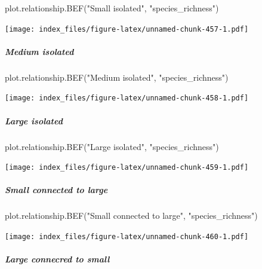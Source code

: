 \documentclass[
]{article}
\newenvironment{Shaded}{\begin{snugshade}}{\end{snugshade}}
\newcommand{\FunctionTok}[1]{\textcolor[rgb]{0.00,0.00,0.00}{#1}}
\newcommand{\NormalTok}[1]{#1}
\newcommand{\StringTok}[1]{\textcolor[rgb]{0.31,0.60,0.02}{#1}}
\begin{document}
\begin{Shaded}
\begin{Highlighting}[]
\FunctionTok{plot.relationship.BEF}\NormalTok{(}\StringTok{"Small isolated"}\NormalTok{,}
                      \StringTok{"species\_richness"}\NormalTok{)}
\end{Highlighting}
\end{Shaded}

\texttt{[image: index\_files/figure-latex/unnamed-chunk-457-1.pdf]}

\hypertarget{medium-isolated}{%
\subparagraph{Medium isolated}\label{medium-isolated}}

\begin{Shaded}
\begin{Highlighting}[]
\FunctionTok{plot.relationship.BEF}\NormalTok{(}\StringTok{"Medium isolated"}\NormalTok{,}
                      \StringTok{"species\_richness"}\NormalTok{)}
\end{Highlighting}
\end{Shaded}

\texttt{[image: index\_files/figure-latex/unnamed-chunk-458-1.pdf]}

\hypertarget{large-isolated}{%
\subparagraph{Large isolated}\label{large-isolated}}

\begin{Shaded}
\begin{Highlighting}[]
\FunctionTok{plot.relationship.BEF}\NormalTok{(}\StringTok{"Large isolated"}\NormalTok{,}
                      \StringTok{"species\_richness"}\NormalTok{)}
\end{Highlighting}
\end{Shaded}

\texttt{[image: index\_files/figure-latex/unnamed-chunk-459-1.pdf]}

\hypertarget{small-connected-to-large}{%
\subparagraph{Small connected to large}\label{small-connected-to-large}}

\begin{Shaded}
\begin{Highlighting}[]
\FunctionTok{plot.relationship.BEF}\NormalTok{(}\StringTok{"Small connected to large"}\NormalTok{,}
                      \StringTok{"species\_richness"}\NormalTok{)}
\end{Highlighting}
\end{Shaded}

\texttt{[image: index\_files/figure-latex/unnamed-chunk-460-1.pdf]}

\hypertarget{large-connecred-to-small}{%
\subparagraph{Large connecred to small}\label{large-connecred-to-small}}
\end{document}
